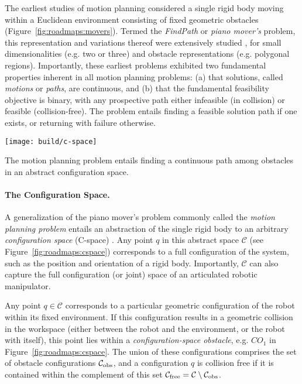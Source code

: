 The earliest studies of motion planning considered a single rigid
body moving within a Euclidean environment consisting of
fixed geometric obstacles
(Figure~\ref{fig:roadmaps:movers}).
Termed the \emph{FindPath} or \emph{piano mover's} problem,
this representation and variations thereof were extensively studied
\citep{lozanoperezwedley1979collisionfree,
   schwartzsharir1983pianomovers1},
for small dimensionalities (e.g. two or three)
and obstacle representations (e.g. polygonal regions).
Importantly,
these earliest problems exhibited two fundamental properties
inherent in all motion planning problems:
(a) that solutions,
called \emph{motions} or \emph{paths},
are continuous, and
(b) that the fundamental feasibility objective is binary,
with any prospective path either infeasible (in collision)
or feasible (collision-free).
The problem entails finding a feasible solution path if one exists,
or returning with failure otherwise.

\begin{marginfigure}
   \centering
   \texttt{[image: build/c-space]} %
   \caption{The motion planning problem entails finding a continuous
      path among obstacles in an abstract configuration space.}
   \label{fig:roadmaps:cspace}
\end{marginfigure}

\paragraph{The Configuration Space.}
A generalization of the piano mover's problem
commonly called the \emph{motion planning problem}
entails an abstraction of the single rigid body
to an arbitrary \emph{configuration space} (C-space)
\citep{lozanoperez1983cspace}.
Any point $q$ in this abstract space $\mathcal{C}$
(see Figure~\ref{fig:roadmaps:cspace})
corresponds to a full configuration of the system,
such as the position and orientation of a rigid body.
Importantly,
$\mathcal{C}$ can also capture the full configuration (or joint)
space of an articulated robotic manipulator.

Any point $q \in \mathcal{C}$ corresponds to a particular geometric
configuration of the robot within its fixed environment.
If this configuration results in a geometric collision in the workspace
(either between the robot and the environment,
or the robot with itself),
this point lies within a \emph{configuration-space obstacle},
e.g. $CO_1$ in Figure~\ref{fig:roadmaps:cspace}.
The union of these configurations comprises the set of obstacle
configurations $\mathcal{C}_{\mbox{\scriptsize obs}}$,
and a configuration $q$ is collision free if
it is contained within the complement of this set
$\mathcal{C}_{\mbox{\scriptsize free}} = \mathcal{C} \setminus \mathcal{C}_{\mbox{\scriptsize obs}}$.

